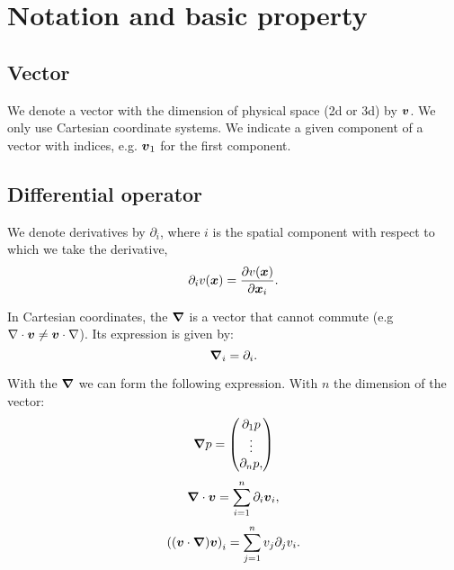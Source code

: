 \chapter{Notation and basic property}
\minitoc


\section{Vector}

We denote a vector with the dimension of physical space (2d or 3d) by ${\boldsymbol {v}}$.
We only use Cartesian coordinate systems.
We indicate a given component of a vector with indices, e.g. ${\boldsymbol {v}}_1$ for the first component.

\section{Differential operator}

We denote derivatives by  $\partial_i$, where $i$ is the spatial component with respect to which we take the derivative,
\begin{equation}
 \partial_i v({\boldsymbol {x}})=\frac{\partial v({\boldsymbol {x}})}{\partial {\boldsymbol {x}}_{i}}.
\end{equation}

\begin{definition}[Nabla]
 In Cartesian coordinates, the ${\boldsymbol {\nabla}}$ is a vector that cannot commute (e.g $\nabla \cdot {\boldsymbol {v}}\neq {\boldsymbol {v}}\cdot \nabla$).
 Its expression is given by:
 \begin{equation}
 {\boldsymbol {\nabla}}_{i}=\partial_{i}.
 \end{equation}
\end{definition}

With the ${\boldsymbol {\nabla}}$ we can form the following expression.
With $n$ the dimension of the vector:
\begin{equation}
 {\boldsymbol {\nabla}}p=\begin{pmatrix}\partial_1 p\\ \vdots \\ \partial_n p,\end{pmatrix}
\end{equation}
\begin{equation}
 {\boldsymbol {\nabla}}\cdot {\boldsymbol {v}}=\sum_{i=1}^{n}\partial_i {\boldsymbol {v}}_i,
\end{equation}
\begin{equation}
 \left(({\boldsymbol {v}}\cdot{\boldsymbol {\nabla}}){\boldsymbol {v}}\right)_{i}=\sum_{j=1}^{n}v_{j}\partial_{j} v_{i}.
\end{equation}


